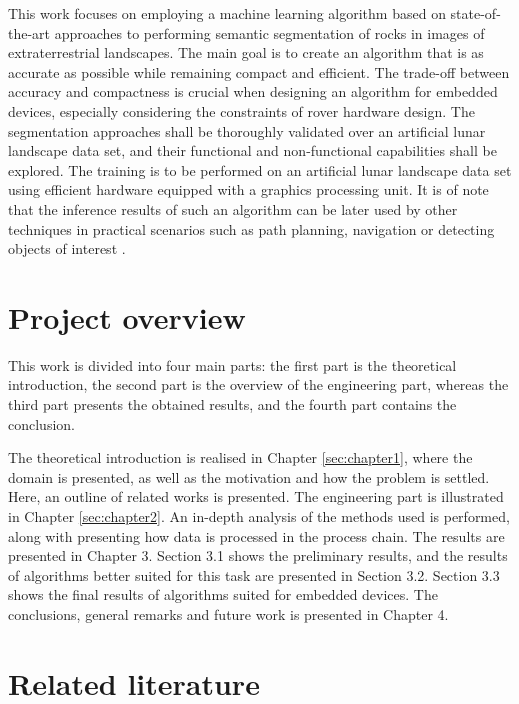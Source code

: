 \documentclass[a4paper,twoside,12pt]{book}
\begin{document}
This work focuses on employing a machine learning algorithm based on state-of-the-art approaches to performing semantic segmentation of rocks in images of extraterrestrial landscapes. The main goal is to create an algorithm that is as accurate as possible while remaining compact and efficient. The trade-off between accuracy and compactness is crucial when designing an algorithm for embedded devices, especially considering the constraints of rover hardware design. The segmentation approaches shall be thoroughly validated over an artificial lunar landscape data set, and their functional and non-functional capabilities shall be explored. The training is to be performed on an artificial lunar landscape data set using efficient hardware equipped with a graphics processing unit. It is of note that the inference results of such an algorithm can be later used by other techniques in practical scenarios such as path planning, navigation or detecting objects of interest \cite{7119022}.

\section{Project overview}
\label{sec:chapter1.2}
This work is divided into four main parts: the first part is the theoretical introduction, the second part is the overview of the engineering part, whereas the third part presents the obtained results, and the fourth part contains the conclusion.

The theoretical introduction is realised in Chapter \ref{sec:chapter1}, where the domain is presented, as well as the motivation and how the problem is settled. Here, an outline of related works is presented. The engineering part is illustrated in Chapter \ref{sec:chapter2}. An in-depth analysis of the methods used is performed, along with presenting how data is processed in the process chain. The results are presented in Chapter 3. Section 3.1 shows the preliminary results, and the results of algorithms better suited for this task are presented in Section 3.2. Section 3.3 shows the final results of algorithms suited for embedded devices. The conclusions, general remarks and future work is presented in Chapter 4.

\section{Related literature}
\label{sef:chapter1.3}
\end{document}
